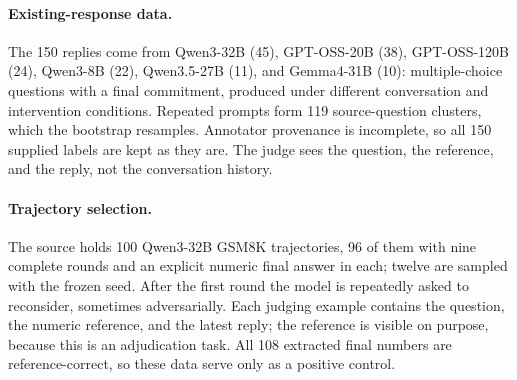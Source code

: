 \documentclass[11pt]{article}
\begin{document}
\paragraph{Existing-response data.}
The 150 replies come from Qwen3-32B (45), GPT-OSS-20B (38), GPT-OSS-120B (24), Qwen3-8B (22), Qwen3.5-27B (11), and Gemma4-31B (10): multiple-choice questions with a final commitment, produced under different conversation and intervention conditions. Repeated prompts form 119 source-question clusters, which the bootstrap resamples. Annotator provenance is incomplete, so all 150 supplied labels are kept as they are. The judge sees the question, the reference, and the reply, not the conversation history.
\paragraph{Trajectory selection.}
The source holds 100 Qwen3-32B GSM8K trajectories, 96 of them with nine complete rounds and an explicit numeric final answer in each; twelve are sampled with the frozen seed. After the first round the model is repeatedly asked to reconsider, sometimes adversarially. Each judging example contains the question, the numeric reference, and the latest reply; the reference is visible on purpose, because this is an adjudication task. All 108 extracted final numbers are reference-correct, so these data serve only as a positive control.
\FloatBarrier
\end{document}
